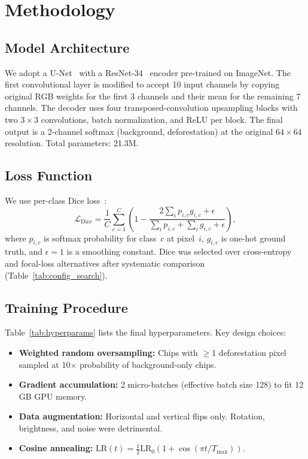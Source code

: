 \documentclass[twocolumn]{article}
\begin{document}
\section{Methodology}

\subsection{Model Architecture}
We adopt a U-Net~\cite{unet} with a ResNet-34~\cite{resnet} 
encoder pre-trained on ImageNet.  The first convolutional layer 
is modified to accept 10 input channels by copying original RGB 
weights for the first 3 channels and their mean for the remaining 
7 channels.  The decoder uses four transposed-convolution 
upsampling blocks with two $3\times3$ convolutions, batch 
normalization, and ReLU per block.  The final output is a 
2-channel softmax (background, deforestation) at the original 
$64\times64$ resolution.  Total parameters: 21.3M.

\subsection{Loss Function}
We use per-class Dice loss~\cite{dice}:
\begin{equation}
\mathcal{L}_{\text{Dice}} = \frac{1}{C} \sum_{c=1}^{C} 
\left(1 - \frac{2 \sum_i p_{i,c} g_{i,c} + \epsilon}
                 {\sum_i p_{i,c} + \sum_i g_{i,c} + \epsilon}\right),
\end{equation}
where $p_{i,c}$ is softmax probability for class~$c$ at 
pixel~$i$, $g_{i,c}$ is one-hot ground truth, and $\epsilon=1$ 
is a smoothing constant.  Dice was selected over 
cross-entropy and focal-loss alternatives after systematic 
comparison (Table~\ref{tab:config_search}).

\subsection{Training Procedure}
Table~\ref{tab:hyperparams} lists the final hyperparameters.  
Key design choices:
\begin{itemize}
    \item \textbf{Weighted random oversampling:} Chips with 
          $\ge$1 deforestation pixel sampled at 10$\times$ 
          probability of background-only chips.
    \item \textbf{Gradient accumulation:} 2 micro-batches 
          (effective batch size 128) to fit 12\,GB GPU memory.
    \item \textbf{Data augmentation:} Horizontal and vertical 
          flips only.  Rotation, brightness, and noise were 
          detrimental.
    \item \textbf{Cosine annealing:} $\text{LR}(t) = 
          \frac{1}{2}\text{LR}_0(1 + \cos(\pi t/T_{\max}))$.
\end{itemize}
\end{document}
